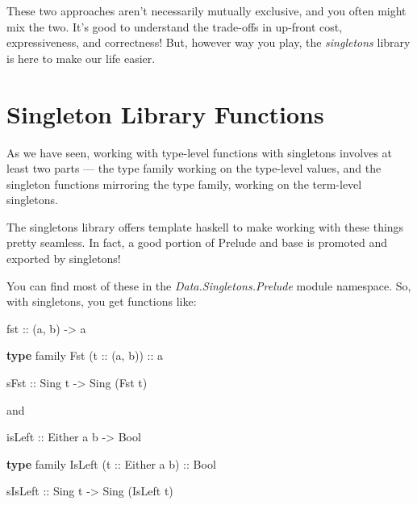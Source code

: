 \documentclass[]{article}
\newenvironment{Shaded}{}{}
\newcommand{\DataTypeTok}[1]{\textcolor[rgb]{0.56,0.13,0.00}{#1}}
\newcommand{\KeywordTok}[1]{\textcolor[rgb]{0.00,0.44,0.13}{\textbf{#1}}}
\newcommand{\NormalTok}[1]{#1}
\newcommand{\OtherTok}[1]{\textcolor[rgb]{0.00,0.44,0.13}{#1}}
\begin{document}
These two approaches aren't necessarily mutually exclusive, and you often might
mix the two. It's good to understand the trade-offs in up-front cost,
expressiveness, and correctness! But, however way you play, the
\emph{singletons} library is here to make our life easier.

\hypertarget{singleton-library-functions}{%
\section{Singleton Library Functions}\label{singleton-library-functions}}

As we have seen, working with type-level functions with singletons involves at
least two parts --- the type family working on the type-level values, and the
singleton functions mirroring the type family, working on the term-level
singletons.

The singletons library offers template haskell to make working with these things
pretty seamless. In fact, a good portion of Prelude and base is promoted and
exported by singletons!

You can find most of these in the \emph{Data.Singletons.Prelude} module
namespace. So, with singletons, you get functions like:

\begin{Shaded}
\begin{Highlighting}[]
\NormalTok{fst}\OtherTok{ ::}\NormalTok{ (a, b) }\OtherTok{->}\NormalTok{ a}

\KeywordTok{type}\NormalTok{ family }\DataTypeTok{Fst}\NormalTok{ (}\OtherTok{t ::}\NormalTok{ (a, b))}\OtherTok{ ::}\NormalTok{ a}

\OtherTok{sFst ::} \DataTypeTok{Sing}\NormalTok{ t }\OtherTok{->} \DataTypeTok{Sing}\NormalTok{ (}\DataTypeTok{Fst}\NormalTok{ t)}
\end{Highlighting}
\end{Shaded}

and

\begin{Shaded}
\begin{Highlighting}[]
\OtherTok{isLeft ::} \DataTypeTok{Either}\NormalTok{ a b }\OtherTok{->} \DataTypeTok{Bool}

\KeywordTok{type}\NormalTok{ family }\DataTypeTok{IsLeft}\NormalTok{ (}\OtherTok{t ::} \DataTypeTok{Either}\NormalTok{ a b)}\OtherTok{ ::} \DataTypeTok{Bool}

\OtherTok{sIsLeft ::} \DataTypeTok{Sing}\NormalTok{ t }\OtherTok{->} \DataTypeTok{Sing}\NormalTok{ (}\DataTypeTok{IsLeft}\NormalTok{ t)}
\end{Highlighting}
\end{Shaded}
\end{document}

